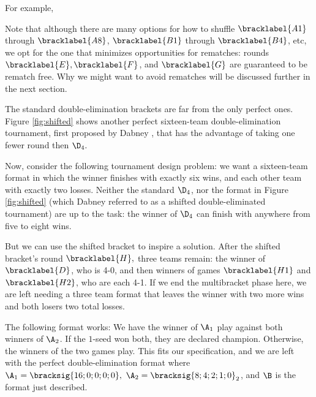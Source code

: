 {    For example,


    Note that although there are many options for how to shuffle $\bracklabel{A1}$ through $\bracklabel{A8}$, $\bracklabel{B1}$ through $\bracklabel{B4}$, etc, we opt for the one that minimizes opportunities for rematches: rounds $\bracklabel{E}, \bracklabel{F}$, and $\bracklabel{G}$ are guaranteed to be rematch free. Why we might want to avoid rematches will be discussed further in the next section.

    The standard double-elimination brackets are far from the only perfect ones. Figure \ref{fig:shifted} shows another perfect sixteen-team double-elimination tournament, first proposed by Dabney \cite{shifted}, that has the advantage of taking one fewer round then $\D_4.$


    Now, consider the following tournament design problem: we want a sixteen-team format in which the winner finishes with exactly six wins, and each other team with exactly two losses. Neither the standard $\D_4$, nor the format in Figure \ref{fig:shifted} (which Dabney referred to as a \i{shifted} double-eliminated tournament) are up to the task: the winner of $\D_4$ can finish with anywhere from five to eight wins.

    But we can use the shifted bracket to inspire a solution. After the shifted bracket's round $\bracklabel{H},$ three teams remain: the winner of $\bracklabel{D}$, who is 4-0, and then winners of games $\bracklabel{H1}$ and $\bracklabel{H2}$, who are each 4-1. If we end the multibracket phase here, we are left needing a three team format that leaves the winner with two more wins and both losers two total losses.

    The following format works: We have the winner of $\A_1$ play against both winners of $\A_2$. If the $1$-seed won both, they are declared champion. Otherwise, the winners of the two games play. This fits our specification, and we are left with the perfect double-elimination format where $\A_1 = \bracksig{16;0;0;0;0},\ \A_2 = \bracksig{8;4;2;1;0}_2$, and $\B$ is the format just described.
    

}
